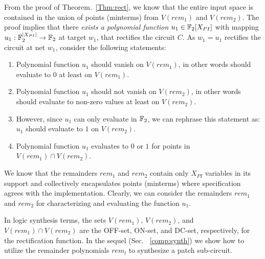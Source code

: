 From the proof of Theorem.~\ref{Thm:rect}, we know that the entire input space is contained in the 
union of points (minterms) from $V(rem_1)$ and $V(rem_2)$. The proof implies that there {\it exists a
polynomial function} $u_1\in {\mathbb{F}}_2[X_{PI}]$ with mapping $u_1:{\mathbb{F}}_{2}^{|X_{PI}|}\rightarrow {\mathbb{F}}_{2}$ 
at target $w_1$, that rectifies the circuit $C$.  
As $w_1 = u_1$ rectifies the circuit at net $w_1$, consider the following statements: 

\begin{enumerate}
  \item Polynomial function $u_1$ should vanish on $V(rem_1)$, in other words should evaluate 
  to $0$ at least on $V(rem_1)$.
  \item Polynomial function $u_1$ should not vanish on $V(rem_2)$, in other words should evaluate 
  to non-zero values at least on $V(rem_2)$.
  \bi
    \item However, since $u_1$ can only evaluate in ${\mathbb{F}}_2$, we can rephrase this statement as:
    $u_1$ should evaluate to $1$ on $V(rem_2)$. 
  \ei
  \item Polynomial function $u_1$ evaluates to $0$ or $1$ for points in $V(rem_1) \cap V(rem_2)$.
\end{enumerate}

We know that the remainders $rem_1$ and $rem_2$ contain 
only $X_{PI}$ variables in its support and collectively encapsulates points (minterms) where 
specification agrees with the implementation. Clearly, we can consider the remainders $rem_1$
and $rem_2$ for characterizing and evaluating the function $u_1$. 

In logic synthesis terms, the sets $V(rem_1)$, $V(rem_2)$, and
$V(rem_1) \cap V(rem_2)$ are the OFF-set, ON-set, and DC-set, respectively, for the
rectification function. In the sequel (Sec. ~\ref{comp:synth}) we show how to utilize the
remainder polynomials $rem_l$ to synthesize a patch sub-circuit. 


